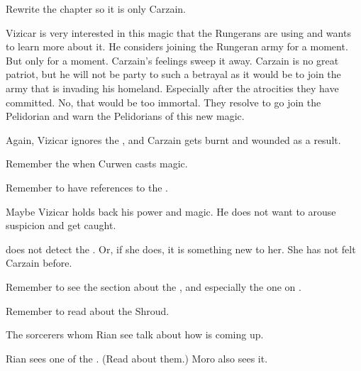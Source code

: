 \begin{changes}
  \begin{comment}
  \paragraph{The \Caliph Inviolate}
  \end{comment}
    Rewrite the chapter so it is only Carzain.
    
    Vizicar is very interested in this magic that the Rungerans are using and wants to learn more about it. 
    He considers joining the Rungeran army for a moment. 
    But only for a moment. 
    Carzain's feelings sweep it away. 
    Carzain is no great patriot, but he will not be party to such a betrayal as it would be to join the army that is invading his homeland. 
    Especially after the atrocities they have committed.
    No, that would be too immortal.
    They resolve to go join the Pelidorian \ishrah{} and warn the Pelidorians of this new magic. 
    
    Again, Vizicar ignores the , and Carzain gets burnt and wounded as a result. 
    
    Remember the  when Curwen casts magic. 
    
    Remember to have references to the . 
    
    Maybe Vizicar holds back his power and magic. 
    He does not want to arouse suspicion and get caught. 
    
    \Takestsha{} does not detect the \vertex. 
    Or, if she does, it is something new to her. 
    She has not felt Carzain before. 

    Remember to see the section about the , and especially the one on . 
  
  \begin{comment}
  \paragraph{The Thirsty Nether}
  \end{comment}
    Remember to read about the Shroud. 
  
    The sorcerers whom Rian see talk about how  is coming up. 
    
    Rian sees one of the . 
    (Read about them.) 
    Moro also sees it. 
    

\end{changes}
